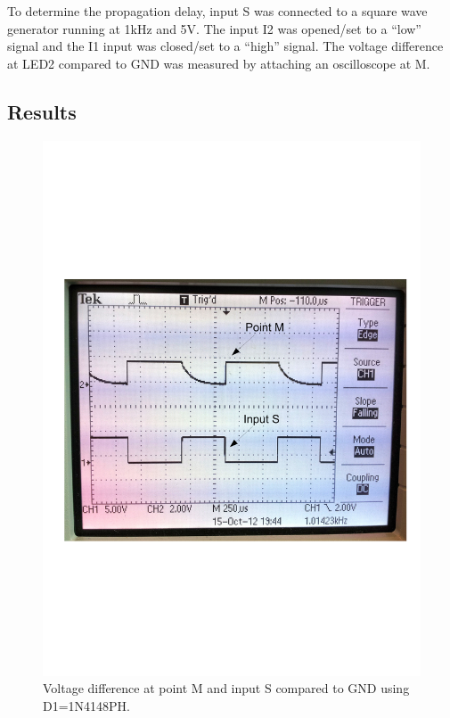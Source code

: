 \documentclass[journal]{IEEEtran}
\begin{document}
To determine the propagation delay, input S was connected to a square
wave generator running at 1kHz and 5V. The input I2 was opened/set to a ``low''
signal and the I1 input was closed/set to a ``high'' signal. The voltage
difference at LED2 compared to GND was measured by attaching an oscilloscope at
M.

\subsection{Results} 

\begin{figure}
  \centering
   \includegraphics[trim=15mm 75mm 10mm 80mm, clip,
   width=\columnwidth]{img/shift_volt1.pdf}
   \caption{Voltage difference at point M and input S compared to GND using
   D1=1N4148PH.}
   \label{fig:signal_m1}
\end{figure}
\end{document}
